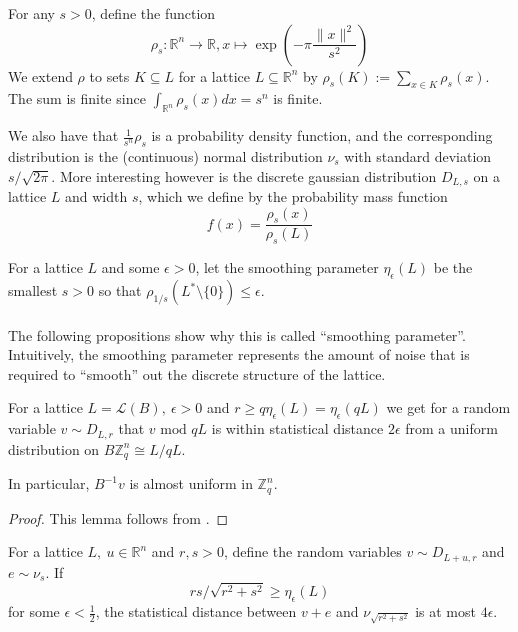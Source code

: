 \documentclass{report}
\newcommand{\Z}{\mathbb{Z}}
\newcommand{\R}{\mathbb{R}}
\renewcommand{\mod}{\text{ mod }}
\newcommand{\noqed}{\phantom\qedhere}
\begin{document}
For any $s > 0$, define the function
\begin{equation}
\rho_s: \R^n \to \R, x \mapsto \exp\left(-\pi\frac {\| x \|^2} {s^2}\right) \nonumber
\end{equation}
We extend $\rho$ to sets $K \subseteq L$ for a lattice $L \subseteq \R^n$ by $\rho_s(K) := \sum_{x \in K} \rho_s(x)$. The sum is finite since $\int_{\R^n} \rho_s(x) dx = s^n$ is finite.

We also have that $\frac 1 {s^n} \rho_s$ is a probability density function, and the corresponding distribution is the (continuous) normal distribution $\nu_s$ with standard deviation $s/\sqrt{2\pi}$. More interesting however is the discrete gaussian distribution $D_{L, s}$ on a lattice $L$ and width $s$, which we define by the probability mass function
\begin{equation}
f(x) = \frac {\rho_s(x)} {\rho_s(L)} \nonumber
\end{equation}

 For a lattice $L$ and some $\epsilon > 0$, let the smoothing parameter $\eta_\epsilon(L)$ be the smallest $s > 0$ so that $\rho_{1/s}(L^* \setminus \{ 0 \}) \leq \epsilon$.
\\\\
The following propositions show why this is called ``smoothing parameter''. Intuitively, the smoothing parameter represents the amount of noise that is required to ``smooth'' out the discrete structure of the lattice.

\lemma
\label{smoothing_parameter_smooth_discrete_structure}
For a lattice $L = \mathcal{L}(B),\ \epsilon > 0$ and $r \geq q \eta_\epsilon(L) = \eta_\epsilon(q L)$ we get for a random variable $v \sim D_{L, r}$ that $v \mod qL$ is within statistical distance $2\epsilon$ from a uniform distribution on $B\Z_q^n \cong L/qL$.

In particular, $B^{-1}v$ is almost uniform in $\Z_q^n$.

\begin{proof} \noqed
This lemma follows from \cite[3.8]{Reg}.
\end{proof}

\lemma
\label{smoothing_parameter_smooth_discrete_gaussian}
For a lattice $L,\ u \in \R^n$ and $r, s > 0$, define the random variables $v \sim D_{L + u, r}$ and $e \sim \nu_s$. If
\begin{equation}
rs / \sqrt{r^2 + s^2} \geq \eta_\epsilon(L) \nonumber
\end{equation}
for some $\epsilon < \frac 1 2$, the statistical distance between $v + e$ and $\nu_{\sqrt{r^2 + s^2}}$ is at most $4\epsilon$.
\end{document}
